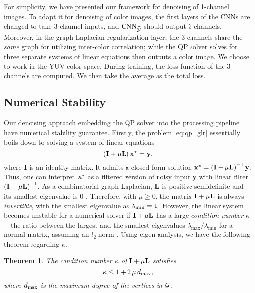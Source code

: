 \documentclass[10pt,twocolumn,letterpaper]{article}
\newtheorem{theorem}{Theorem}
\begin{document}
For simplicity, we have presented our framework for denoising of 1-channel images. 
To adapt it for denoising of color images, the first layers of the CNNs are changed to take 3-channel inputs, and ${\rm CNN}_{\widehat{\cal Y}}$ should output 3 channels. 
Moreover, in the graph Laplacian regularization layer, the 3 channels share the \emph{same} graph for utilizing inter-color correlation; while the QP solver solves for three separate systems of linear equations then outputs a color image. 
We choose to work in the YUV color space.
During training, the loss function of the 3 channels are computed. 
We then take the average as the total loss.

\subsection{Numerical Stability}
\label{ssec:glr_loss}
Our denoising approach embedding the QP solver into the processing pipeline have numerical stability guarantee.
Firstly, the problem \eqref{eq:qp_glr} essentially boils down to solving a system of linear equations
\begin{equation}\label{eq:qp_system}
\left({\bf I}+\mu{\bf L}\right){\bf x}^{\star}={\bf y},
\end{equation}
where {\bf I} is an identity matrix. 
It admits a closed-form solution ${\bf x}^{\star} = \left({\bf I} + \mu{\bf L}\right)^{-1}{\bf y}$. 
Thus, one can interpret ${\bf x}^{\star}$ as a filtered version of noisy input {\bf y} with linear filter $\left({\bf I} + \mu{\bf L}\right)^{-1}$. 
As a combinatorial graph Laplacian, ${\bf L}$ is positive semidefinite and its smallest eigenvalue is 0 \cite{shuman2013emerging}.
Therefore, with $\mu \ge 0$, the matrix ${\bf I} + \mu{\bf L}$ is always \emph{invertible}, with the smallest eigenvalue as $\lambda_{\rm min}=1$. 
However, the linear system becomes unstable for a numerical solver if ${\bf I} + \mu{\bf L}$ has a large \textit{condition number} $\kappa$---the ratio between the largest and the smallest eigenvalues $\lambda_{\max} / \lambda_{\min}$ for a normal matrix, assuming an $l_2$-norm \cite{horn1990matrix}. 
Using eigen-analysis, we have the following theorem regarding $\kappa$.
\begin{theorem}\label{thm:cond}
The condition number $\kappa$ of ${\bf I} + \mu{\bf L}$ satisfies
\begin{equation}
\kappa \le 1 + 2 \, \mu \, d_{\rm max}, 
\end{equation}
where $d_{\rm max}$ is the maximum degree of the vertices in ${\cal G}$.
\end{theorem}
\end{document}
